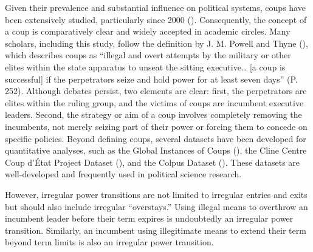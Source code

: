 \documentclass[
  12pt,
]{report}
\begin{document}
Given their prevalence and substantial influence on political systems,
coups have been extensively studied, particularly since 2000
(). Consequently,
the concept of a coup is comparatively clear and widely accepted in
academic circles. Many scholars, including this study, follow the
definition by J. M. Powell and Thyne (),
which describes coups as ``illegal and overt attempts by the military or
other elites within the state apparatus to unseat the sitting
executive\ldots{} {[}a coup is successful{]} if the perpetrators seize
and hold power for at least seven days'' (P. 252). Although debates
persist, two elements are clear: first, the perpetrators are elites
within the ruling group, and the victims of coups are incumbent
executive leaders. Second, the strategy or aim of a coup involves
completely removing the incumbents, not merely seizing part of their
power or forcing them to concede on specific policies. Beyond defining
coups, several datasets have been developed for quantitative analyses,
such as the Global Instances of Coups (), the Cline Centre Coup d'État Project Dataset
(), and the Colpus Dataset
(). These datasets
are well-developed and frequently used in political science research.

However, irregular power transitions are not limited to irregular
entries and exits but should also include irregular ``overstays.'' Using
illegal means to overthrow an incumbent leader before their term expires
is undoubtedly an irregular power transition. Similarly, an incumbent
using illegitimate means to extend their term beyond term limits is also
an irregular power transition.
\end{document}
